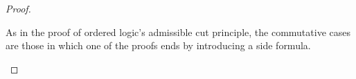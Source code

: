 \begin{proof}
\begin{description}[listparindent=\parindent, parsep=0pt]
  \item[Commutative cases]
    As in the proof of ordered logic's admissible cut principle, the commutative cases are those in which one of the proofs ends by introducing a side formula.



\end{description}
\end{proof}
